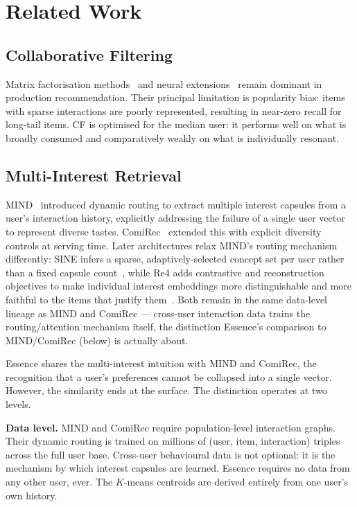 \documentclass[11pt,a4paper]{article}
\begin{document}
\section{Related Work}
\label{sec:related}

\subsection{Collaborative Filtering}
\label{sec:cf}
Matrix factorisation methods~\cite{koren2009} and neural
extensions~\cite{he2017} remain dominant in production recommendation. Their
principal limitation is popularity bias: items with sparse interactions are
poorly represented, resulting in near-zero recall for long-tail items. CF is
optimised for the median user: it performs well on what is broadly consumed
and comparatively weakly on what is individually resonant.

\subsection{Multi-Interest Retrieval}
\label{subsec:multi}

MIND~\cite{li2019} introduced dynamic routing to extract multiple interest
capsules from a user's interaction history, explicitly addressing the failure
of a single user vector to represent diverse tastes. ComiRec~\cite{cen2020}
extended this with explicit diversity controls at serving time. Later
architectures relax MIND's routing mechanism differently: SINE infers a
sparse, adaptively-selected concept set per user rather than a fixed
capsule count~\cite{tan2021}, while Re4 adds contrastive and
reconstruction objectives to make individual interest embeddings more
distinguishable and more faithful to the items that justify
them~\cite{zhang2022}. Both remain in the same data-level lineage as
MIND and ComiRec --- cross-user interaction data trains the
routing/attention mechanism itself, the distinction Essence's comparison
to MIND/ComiRec (below) is actually about.

Essence shares the multi-interest intuition with MIND and ComiRec, the
recognition that a user's preferences cannot be collapsed into a single
vector. However, the similarity ends at the surface. The distinction operates
at two levels.

\textbf{Data level.} MIND and ComiRec require population-level interaction
graphs. Their dynamic routing is trained on millions of (user, item,
interaction) triples across the full user base. Cross-user behavioural data
is not optional: it is the mechanism by which interest capsules are learned.
Essence requires no data from any other user, ever. The $K$-means centroids
are derived entirely from one user's own history.
\end{document}
